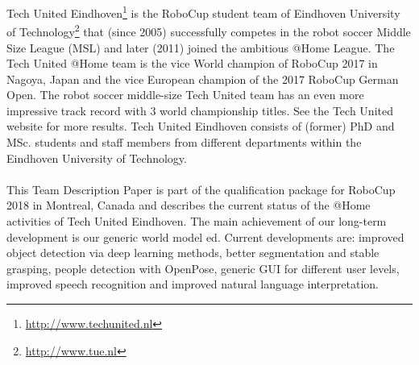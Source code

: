 Tech United Eindhoven\footnote{\url{http://www.techunited.nl}} is the RoboCup student team of Eindhoven University of Technology\footnote{\url{http://www.tue.nl}} that (since 2005) successfully competes in the robot soccer Middle Size League (MSL) and later (2011) joined the ambitious @Home League. The Tech United @Home team is the vice World champion of RoboCup 2017 in Nagoya, Japan and the vice European champion of the 2017 RoboCup German Open. The robot soccer middle-size Tech United team has an even more impressive track record with 3 world championship titles. See the Tech United website for more results. Tech United Eindhoven consists of (former) PhD and MSc. students and staff members from different departments within the Eindhoven University of Technology.
\\\\
This Team Description Paper is part of the qualification package for RoboCup 2018 in Montreal, Canada and describes the current status of the @Home activities of Tech United Eindhoven. The main achievement of our long-term development is our generic world model \acrshort{ed}. Current developments are: improved object detection via deep learning methods, better segmentation and stable grasping, people detection with OpenPose, generic GUI for different user levels, improved speech recognition and improved natural language interpretation. 